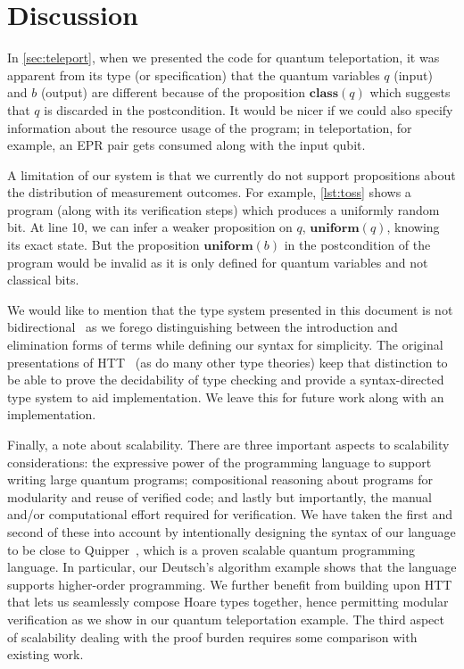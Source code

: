 \section{Discussion}

In \cref{sec:teleport}, when we presented the code for quantum teleportation, it was apparent from its type (or specification) that the quantum variables $q$ (input) and $b$ (output) are different because of the proposition $\mathbf{class}(q)$ which suggests that $q$ is discarded in the postcondition. It would be nicer if we could also specify information about the resource usage of the program; in teleportation, for example, an EPR pair gets consumed along with the input qubit.

A limitation of our system is that we currently do not support propositions about the distribution of measurement outcomes. For example, \cref{lst:toss} shows a program (along with its verification steps) which produces a uniformly random bit. At line 10, we can infer a weaker proposition on $q$, $\textbf{uniform}(q)$, knowing its exact state. But the proposition $\textbf{uniform}(b)$ in the postcondition of the program would be invalid as it is only defined for quantum variables and not classical bits.



We would like to mention that the type system presented in this document is not bidirectional~\parencite{dunfield2019bidirectional} as we forego distinguishing between the introduction and elimination forms of terms while defining our syntax for simplicity. The original presentations of HTT~\parencite{nanevski2008,abspr07} (as do many other type theories) keep that distinction to be able to prove the decidability of type checking and provide a syntax-directed type system to aid implementation. We leave this for future work along with an implementation.

Finally, a note about scalability. There are three important aspects to scalability considerations: the expressive power of the programming language to support writing large quantum programs; compositional reasoning about programs for modularity and reuse of verified code; and lastly but importantly, the manual and/or computational effort required for verification. We have taken the first and second of these into account by intentionally designing the syntax of our language to be close to Quipper~\parencite{quipper2013}, which is a proven scalable quantum programming language. In particular, our Deutsch's algorithm example shows that the language supports higher-order programming. We further benefit from building upon HTT that lets us seamlessly compose Hoare types together, hence permitting modular verification as we show in our quantum teleportation example. The third aspect of scalability dealing with the proof burden requires some comparison with existing work.

